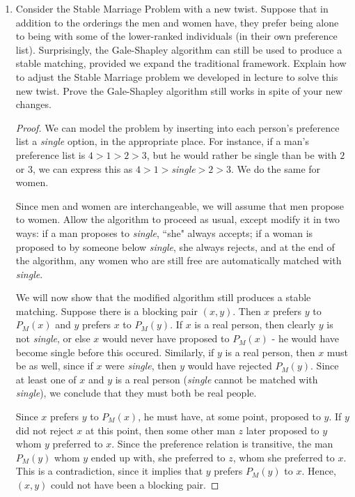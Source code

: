 \documentclass[10pt]{article}
\begin{document}
\begin{enumerate}
\begin{enumerate}
\end{enumerate}

\item Consider the Stable Marriage Problem with a new twist. Suppose that in addition to the orderings the men and women have, they prefer being alone to being with some of the lower-ranked individuals (in their own preference list). Surprisingly, the Gale-Shapley algorithm can still be used to produce a stable matching, provided we expand the traditional framework. Explain how to adjust the Stable Marriage problem we developed in lecture to solve this new twist.  Prove the Gale-Shapley algorithm still works in spite of your new changes.

\begin{proof}
We can model the problem by inserting into each person's preference list a \emph{single} option, in the appropriate place.  For instance, if a man's preference list is $4>1>2>3$, but he would rather be single than be with $2$ or $3$, we can express this as $4>1>$\emph{single}$>2>3$.  We do the same for women.

Since men and women are interchangeable, we will assume that men propose to women.
Allow the algorithm to proceed as usual, except modify it in two ways: if a man proposes to \emph{single}, ``she" always accepts; if a woman is proposed to by someone below \emph{single}, she always rejects, and at the end of the algorithm, any women who are still free are automatically matched with \emph{single}.

We will now show that the modified algorithm still produces a stable matching.  Suppose there is a blocking pair $(x,y)$.  Then $x$ prefers $y$ to $P_M(x)$ and $y$ prefers $x$ to $P_M(y)$.  If $x$ is a real person, then clearly $y$ is not \emph{single}, or else $x$ would never have proposed to $P_M(x)$ - he would have become single before this occured.  Similarly, if $y$ is a real person, then $x$ must be as well, since if $x$ were \emph{single}, then $y$ would have rejected $P_M(y)$.  Since at least one of $x$ and $y$ is a real person (\emph{single} cannot be matched with \emph{single}), we conclude that they must both be real people.

Since $x$ prefers $y$ to $P_M(x)$, he must have, at some point, proposed to $y$.  If $y$ did not reject $x$ at this point, then some other man $z$ later proposed to $y$ whom $y$ preferred to $x$.  Since the preference relation is transitive, the man$P_M(y)$ whom $y$ ended up with, she preferred to $z$, whom she preferred to $x$.  This is a contradiction, since it implies that $y$ prefers $P_M(y)$ to $x$.  Hence, $(x,y)$ could not have been a blocking pair.


\end{proof}
\end{enumerate}
\end{document}
